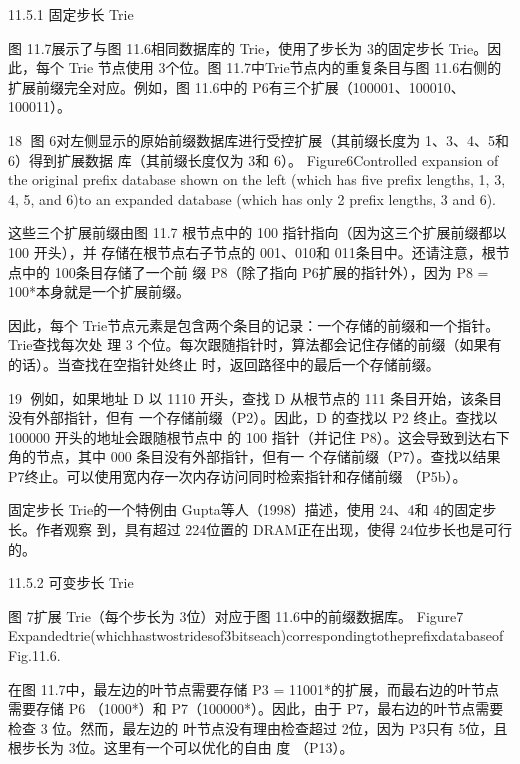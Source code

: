 11.5.1 固定步长 Trie


    图 11.7展示了与图 11.6相同数据库的 Trie，使用了步长为 3的固定步长 Trie。因此，每个 Trie
   节点使用 3个位。图 11.7中Trie节点内的重复条目与图 11.6右侧的扩展前缀完全对应。例如，图
11.6中的 P6有三个扩展（100001、100010、100011）。




                                                           18
图 6对左侧显示的原始前缀数据库进行受控扩展（其前缀长度为 1、3、4、5和 6）得到扩展数据
库（其前缀长度仅为 3和 6）。
Figure6Controlled expansion of the original prefix database shown on the left (which has
five prefix lengths, 1, 3, 4, 5, and 6)to an expanded database (which has only 2 prefix
lengths, 3 and 6).




这些三个扩展前缀由图 11.7 根节点中的 100 指针指向（因为这三个扩展前缀都以 100 开头），并
存储在根节点右子节点的 001、010和 011条目中。还请注意，根节点中的 100条目存储了一个前
缀 P8（除了指向 P6扩展的指针外），因为 P8 = 100*本身就是一个扩展前缀。

因此，每个 Trie节点元素是包含两个条目的记录：一个存储的前缀和一个指针。Trie查找每次处
理 3 个位。每次跟随指针时，算法都会记住存储的前缀（如果有的话）。当查找在空指针处终止
时，返回路径中的最后一个存储前缀。


                                                                                       19
例如，如果地址 D 以 1110 开头，查找 D 从根节点的 111 条目开始，该条目没有外部指针，但有
一个存储前缀（P2）。因此，D 的查找以 P2 终止。查找以 100000 开头的地址会跟随根节点中
的 100 指针（并记住 P8）。这会导致到达右下角的节点，其中 000 条目没有外部指针，但有一
个存储前缀（P7）。查找以结果 P7终止。可以使用宽内存一次内存访问同时检索指针和存储前缀
（P5b）。

固定步长 Trie的一个特例由 Gupta等人（1998）描述，使用 24、4和 4的固定步长。作者观察
到，具有超过 224位置的 DRAM正在出现，使得 24位步长也是可行的。



11.5.2 可变步长 Trie




              图 7扩展 Trie（每个步长为 3位）对应于图 11.6中的前缀数据库。
Figure7
Expandedtrie(whichhastwostridesof3bitseach)correspondingtotheprefixdatabaseofFig.11.6.

在图 11.7中，最左边的叶节点需要存储 P3 = 11001*的扩展，而最右边的叶节点需要存储 P6
（1000*）和 P7（100000*）。因此，由于 P7，最右边的叶节点需要检查 3 位。然而，最左边的
叶节点没有理由检查超过 2位，因为 P3只有 5位，且根步长为 3位。这里有一个可以优化的自由
度
（P13）。

